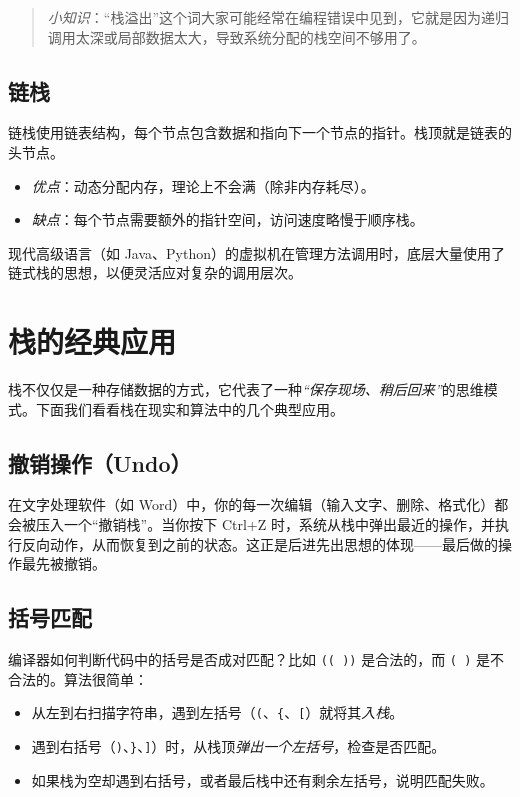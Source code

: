 \begin{quote}
\emph{小知识}：“栈溢出”这个词大家可能经常在编程错误中见到，它就是因为递归调用太深或局部数据太大，导致系统分配的栈空间不够用了。
\end{quote}

\subsection{链栈}

链栈使用链表结构，每个节点包含数据和指向下一个节点的指针。栈顶就是链表的头节点。

\begin{itemize}
    \item \emph{优点}：动态分配内存，理论上不会满（除非内存耗尽）。
    \item \emph{缺点}：每个节点需要额外的指针空间，访问速度略慢于顺序栈。
\end{itemize}

现代高级语言（如 Java、Python）的虚拟机在管理方法调用时，底层大量使用了链式栈的思想，以便灵活应对复杂的调用层次。

\section{栈的经典应用}

栈不仅仅是一种存储数据的方式，它代表了一种\emph{“保存现场、稍后回来”}的思维模式。下面我们看看栈在现实和算法中的几个典型应用。

\subsection{撤销操作（Undo）}

在文字处理软件（如 Word）中，你的每一次编辑（输入文字、删除、格式化）都会被压入一个“撤销栈”。当你按下 Ctrl+Z 时，系统从栈中弹出最近的操作，并执行反向动作，从而恢复到之前的状态。这正是后进先出思想的体现——最后做的操作最先被撤销。

\subsection{括号匹配}

编译器如何判断代码中的括号是否成对匹配？比如 \texttt{(( ))} 是合法的，而 \texttt{({ )}} 是不合法的。算法很简单：

\begin{itemize}
    \item 从左到右扫描字符串，遇到左括号（\texttt{(}、\texttt{\{}、\texttt{[}）就将其\emph{入栈}。
    \item 遇到右括号（\texttt{)}、\texttt{\}}、\texttt{]}）时，从栈顶\emph{弹出一个左括号}，检查是否匹配。
    \item 如果栈为空却遇到右括号，或者最后栈中还有剩余左括号，说明匹配失败。
\end{itemize}

